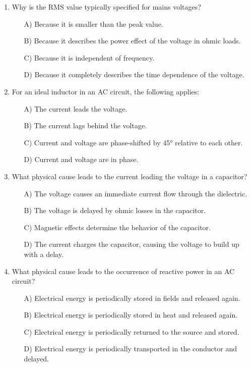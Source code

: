 \documentclass[a4paper,12pt]{article}
\newif\ifshowsolutions
\begin{document}
\begin{enumerate}[label=\textbf{\arabic*.}, leftmargin=*, itemsep=8pt]
\ifshowsolutions
Solution: C
\fi

  \item Why is the RMS value typically specified for mains voltages?
    \begin{itemize}[label=$\square$]
      \item[A)] Because it is smaller than the peak value.
      \item[B)] Because it describes the power effect of the voltage in ohmic loads.
      \item[C)] Because it is independent of frequency.
      \item[D)] Because it completely describes the time dependence of the voltage.
    \end{itemize}

\ifshowsolutions
Solution: B
\fi

  \item For an ideal inductor in an AC circuit, the following applies:
    \begin{itemize}[label=$\square$]
      \item[A)] The current leads the voltage.
      \item[B)] The current lags behind the voltage.
      \item[C)] Current and voltage are phase-shifted by 45° relative to each other.
      \item[D)] Current and voltage are in phase.
    \end{itemize}

\ifshowsolutions
Solution: B
\fi

  \item What physical cause leads to the current leading the voltage in a capacitor?
    \begin{itemize}[label=$\square$]
      \item[A)] The voltage causes an immediate current flow through the dielectric.
      \item[B)] The voltage is delayed by ohmic losses in the capacitor.
      \item[C)] Magnetic effects determine the behavior of the capacitor.
      \item[D)] The current charges the capacitor, causing the voltage to build up with a delay.
    \end{itemize}

\ifshowsolutions
Solution: D
\fi

  \item What physical cause leads to the occurrence of reactive power in an AC circuit?
    \begin{itemize}[label=$\square$]
      \item[A)] Electrical energy is periodically stored in fields and released again.
      \item[B)] Electrical energy is periodically stored in heat and released again.
      \item[C)] Electrical energy is periodically returned to the source and stored.
      \item[D)] Electrical energy is periodically transported in the conductor and delayed.
    \end{itemize}


\end{enumerate}
\end{document}
